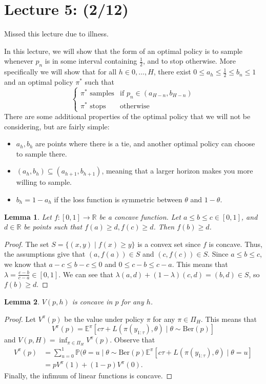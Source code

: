 \documentclass[pdftex,letterpaper,11pt]{article}
\newtheorem{lemma}{Lemma}
\theoremstyle{definition}
\theoremstyle{definition}
\theoremstyle{definition}
\newcommand{\RR}{\mathbb R}
\newcommand{\PP}{\mathbb P}
\newcommand{\EE}{\mathbb E}
\newcommand{\mrm}[1]{\mathrm{#1}}
\begin{document}
\section*{Lecture 5: (2/12)}

Missed this lecture due to illness.

In this lecture, we will show that the form of an optimal policy is to sample whenever $p_n$ is in some interval containing $\frac{1}{2}$, and to stop otherwise. More specifically we will show that for all $h \in 0, \ldots, H$, there exist $0 \leq a_h \leq \frac{1}{2} \leq b_n \leq 1$ and an optimal policy $\pi^*$ such that 
\[\begin{cases}
	\pi^* \mbox{ samples} & \mbox{if } p_n \in (a_{H-n}, b_{H-n})\\
	\pi^* \mbox{ stops} & \mbox{otherwise}
\end{cases}\]
There are some additional properties of the optimal policy that we will not be considering, but are fairly simple:
\begin{itemize}
	\item $a_h, b_h$ are points where there is a tie, and another optimal policy can choose to sample there.
	\item $(a_h, b_h) \subseteq (a_{h+1}, b_{h+1})$, meaning that a larger horizon makes you more willing to sample.
	\item $b_h = 1-a_h$ if the loss function is symmetric between $\theta$ and $1-\theta$.
\end{itemize}

\begin{lemma}\label{lemma:1}
	Let $f: [0,1] \to \RR$ be a concave function. Let $a \leq b \leq c \in [0,1]$, and $d \in \RR$ be points such that $f(a) \geq d, f(c) \geq d$. Then $f(b) \geq d$.
\end{lemma}
\begin{proof}
	The set $S = \{(x,y) \mid f(x) \geq y \}$ is a convex set since $f$ is concave. Thus, the assumptions give that $(a, f(a)) \in S$ and $(c, f(c)) \in S$. Since $a \leq b \leq c$, we know that $a-c \leq b-c \leq 0$ and $0 \leq c-b \leq c-a$. This means that $\lambda = \frac{c-b}{c-a} \in [0,1]$. We can see that $\lambda (a,d) + (1-\lambda)(c,d) = (b, d) \in S$, so $f(b) \geq d$.
\end{proof}

\begin{lemma}
	$V(p,h)$ is concave in $p$ for any $h$.
\end{lemma}
\begin{proof}
	Let $V^\pi(p)$ be the value under policy $\pi$ for any $\pi \in \Pi_H$. This means that
	\[V^\pi(p) = \EE^\pi[c\tau + L(\pi(y_{1:\tau}), \theta) \mid \theta \sim \mrm{Ber}(p) ]\]
	and $V(p,H) = \inf_{\pi \in \Pi_H} V^\pi(p)$. Observe that
	\begin{align*}
		V^\pi(p) & = \sum_{u=0}^1 \PP(\theta=u \mid \theta \sim \mrm{Ber}(p) \EE^\pi[c\tau + L(\pi(y_{1:\tau}), \theta) \mid \theta=u]\\
		& = pV^\pi(1) + (1-p)V^\pi(0).
	\end{align*}
	Finally, the infimum of linear functions is concave.
\end{proof}
\end{document}
